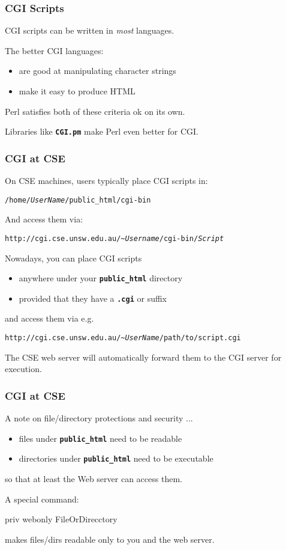 \begin{frame}
\frametitle{CGI Scripts}
CGI scripts can be written in {\em{most}} languages.

The better CGI languages:
\begin{itemize}
\item  are good at manipulating character strings
\item  make it easy to produce HTML
\end{itemize}
Perl satisfies both of these criteria ok on its own.

Libraries like \textbf{\tt{CGI.pm}} make Perl even better for CGI.
\end{frame}

\begin{frame}[fragile]
\frametitle{CGI at CSE}
On CSE machines, users typically place CGI scripts in:

{\tt /home/{\it{UserName}}/public\_html/cgi-bin}

And access them via:

{\tt http://cgi.cse.unsw.edu.au/\textasciitilde{\it{Username}}/cgi-bin/{\it{Script}}}

Nowadays, you can place CGI scripts
\begin{itemize}
\item  anywhere under your \textbf{\tt{public\_html}} directory
\item  provided that they have a \textbf{\tt{.cgi}} or suffix
\end{itemize}
and access them via e.g.

    {\tt http://cgi.cse.unsw.edu.au/\textasciitilde{\it{UserName}}/path/to/script.cgi}

The CSE web server will automatically forward them to
the CGI server for execution.
\end{frame}

\begin{frame}[fragile]
\frametitle{CGI at CSE}
A note on file/directory protections and security ...
\begin{itemize}
\item  files under \textbf{\tt{public\_html}} need to be readable
\item  directories under \textbf{\tt{public\_html}} need to be executable
\end{itemize}
so that at least the Web server can access them.

A special command:
\begin{perl}
    priv webonly FileOrDirecctory
\end{perl}

makes files/dirs readable only to you and the web server.
\end{frame}

